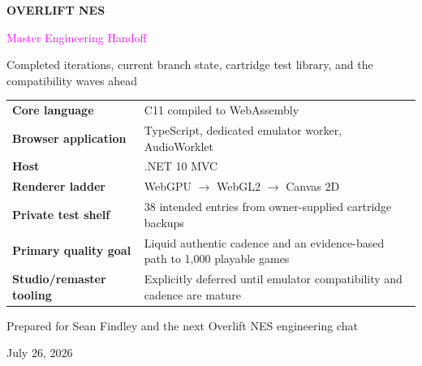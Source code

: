 \documentclass[10pt,letterpaper]{article}
\begin{document}
\begin{titlepage}
\pagecolor{onyx}\color{white}
\vspace*{0.7in}
{\Huge\bfseries OVERLIFT NES\par}
\vspace{0.12in}
{\LARGE\textcolor{magenta}{Master Engineering Handoff}\par}
\vspace{0.22in}
{\large Completed iterations, current branch state, cartridge test library, and the compatibility waves ahead\par}

\vspace{0.55in}

\vfill
\begin{tabularx}{\textwidth}{>{\bfseries}p{1.8in}X}
Core language & C11 compiled to WebAssembly \\
Browser application & TypeScript, dedicated emulator worker, AudioWorklet \\
Host & .NET 10 MVC \\
Renderer ladder & WebGPU $\rightarrow$ WebGL2 $\rightarrow$ Canvas 2D \\
Private test shelf & 38 intended entries from owner-supplied cartridge backups \\
Primary quality goal & Liquid authentic cadence and an evidence-based path to 1,000 playable games \\
Studio/remaster tooling & Explicitly deferred until emulator compatibility and cadence are mature \\
\end{tabularx}

\vfill
{\small Prepared for Sean Findley and the next Overlift NES engineering chat\par}
{\small July 26, 2026\par}
\end{titlepage}
\nopagecolor\color{black}
\end{document}
